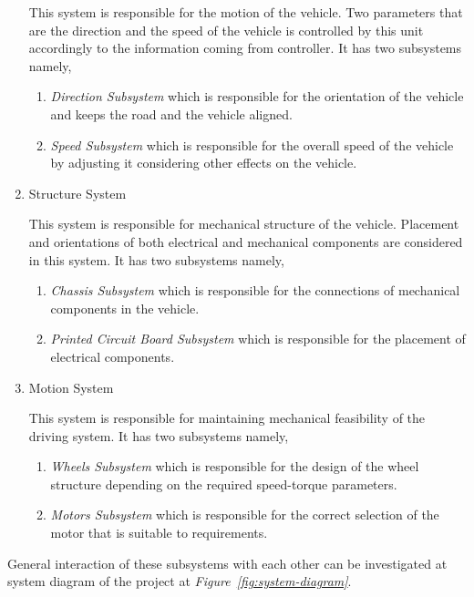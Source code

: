 \documentclass[a4paper,12pt]{article}
\begin{document}
\begin{enumerate}
		This system is responsible for the motion of the vehicle. Two parameters that are the direction and the speed of the vehicle is controlled by this unit accordingly to the information coming from controller. It has two subsystems namely,
			
			\begin{enumerate}
				\item \textit{Direction Subsystem} which is responsible for the orientation of the vehicle and keeps the road and the vehicle aligned.
				\item \textit{Speed Subsystem} which is responsible for the overall speed of the vehicle by adjusting it considering other effects on the vehicle.
			\end{enumerate}
		
		\item Structure System
		
		This system is responsible for mechanical structure of the vehicle. Placement and orientations of both electrical and mechanical components are considered in this system. It has two subsystems namely,
			
			\begin{enumerate}
				\item \textit{Chassis Subsystem} which is responsible for the connections of mechanical components in the vehicle.
				\item \textit{Printed Circuit Board Subsystem} which is responsible for the placement of electrical components.
			\end{enumerate}
		
		\item Motion System
		
		This system is responsible for maintaining mechanical feasibility of the driving system. It has two subsystems namely,
			
			\begin{enumerate}
				\item \textit{Wheels Subsystem} which is responsible for the design of the wheel structure depending on the required speed-torque parameters.
				\item \textit{Motors Subsystem} which is responsible for the correct selection of the motor that is suitable to requirements.
			\end{enumerate}
	\end{enumerate}		
	
	General interaction of these subsystems with each other can be investigated at system diagram of the project at \textit{Figure~\ref{fig:system-diagram}}.
	
\end{document}
